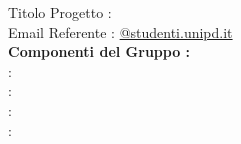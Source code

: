 \documentclass[12pt, a4paper,table]{article}
\title{\textsc{\docNome}}
\date{}
\begin{document}
	\maketitle
	\begin{center}
		
		Titolo Progetto : \huge{\titoloProgetto}
		\\
		\vspace{2em}
		\normalsize Email Referente :  \href{mailto:@studenti.unipd.it}{@studenti.unipd.it}\\
		
		\vspace{3em}
		\textbf{Componenti del Gruppo :}
		\vspace{0.5em}
		\\ \Tber : \MatT
		\vspace{0.5em}
		\\ \Mspa : \MatM
		\vspace{0.5em}
		\\ \Plau : \MatP
		\vspace{0.5em}
		\\ \Amat : \MatA
	\end{center}
	\newpage
	
	
	\newpage
	
	
	\newpage
	
	
	\newpage
	
	
	\newpage
	
	
	\newpage
	
	
	\newpage
	
\end{document}
